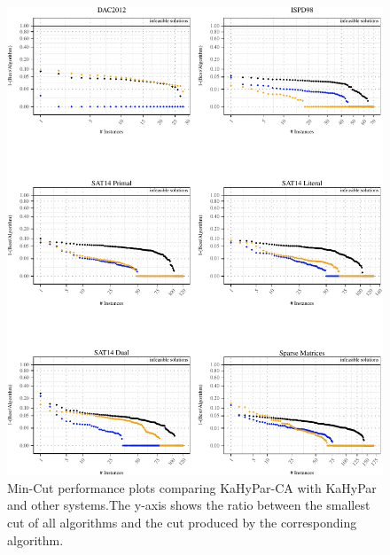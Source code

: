 \documentclass[a4paper,12pt,titlepage, BCOR7mm,headsepline]{scrbook}
\newenvironment{knitrout}{}{} %
\numberwithin{equation}{section}
\begin{document}
\begin{figure}
\centering
\begin{knitrout}
\color{fgcolor}

{\centering \includegraphics[width=.9\textwidth]{./class_performance_plot-1} 

}



\end{knitrout}
\caption{Min-Cut performance plots comparing KaHyPar-CA with KaHyPar and other systems.The y-axis shows the ratio between the smallest cut of all algorithms and the cut produced by the corresponding algorithm.}\label{fig:full}
\end{figure}



\end{document}

